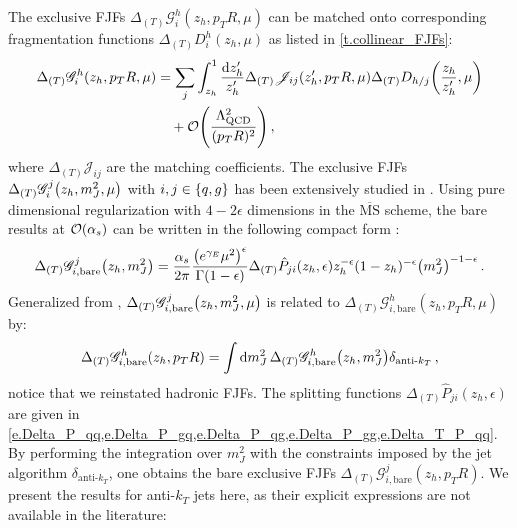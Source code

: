 \documentclass[a4paper, 11 pt]{article}
\begin{document}
The exclusive FJFs $\Delta_{(T)}\mathscr{G}_i^h(z_h, p_TR, \mu)$ can be matched onto corresponding fragmentation functions $\Delta_{(T)}D_i^h(z_h, \mu)$ as listed in \cref{t.collinear_FJFs}:
\begin{align} \label{e.collinear_exclusive_FJF_matching}
\Delta _{(T)} \mathscr{G}_i^h (z_h, p_TR, \mu)
& =
\sum_j \int _{z_h}^1 \frac{\dd{z'_h}}{z'_h}
\Delta _{(T)} \mathscr{J}_{ij} (z'_h, p_TR, \mu)
\Delta _{(T)} D_{h/j} \pqty{\frac{z_h}{z'_h}, \mu}
\nonumber \\
& \quad +
\order{\frac{\Lambda _{\mathrm{QCD}}^2}{(p_TR)^2}}
\, ,
\end{align}
where $\Delta _{(T)} \mathscr{J}_{ij}$ are the matching coefficients.
The exclusive FJFs $\Delta _{(T)} \mathscr{G}_i^j \pqty{z_h, m_J^2, \mu}$ with $i, j \in \Bqty{q, g}$ has been extensively studied in \cite{Jain:2011xz, Ritzmann:2014mka}.
Using pure dimensional regularization with $4 - 2 \epsilon$ dimensions in the $\overline{\mathrm{MS}}$ scheme, the bare results at $\order{\alpha _s}$ can be written in the following compact form \cite{ Giele:1991vf,Ritzmann:2014mka,Chien:2015ctp}:
\begin{equation}
\Delta _{(T)} \mathscr{G}_{i, \mathrm{bare}}^j \pqty{z_h, m_J^2}
=
\frac{\alpha _s}{2 \pi} \frac{\pqty{e^{\gamma _E} \mu^2}^\epsilon}{\Gamma (1 - \epsilon)}
\Delta _{(T)} \hat{P}_{ji}(z_h, \epsilon)
z_h^{-\epsilon} (1-z_h)^{-\epsilon} \pqty{m_J^2}^{-1-\epsilon}
\, .
\end{equation}
Generalized from \cite{Chien:2015ctp}, $\Delta _{(T)} \mathscr{G}_{i, \mathrm{bare}}^j \pqty{z_h, m_J^2, \mu}$ is related to $\Delta _{(T)}\mathscr{G}_{i,  \mathrm{bare}}^h (z_h, p_TR, \mu)$ by:
\begin{equation}
\Delta _{(T)} \mathscr{G}_{i,  \mathrm{bare}}^h (z_h, p_T R)
=
\int \dd{m_J^2} \Delta _{(T)} \mathscr{G}_{i, \mathrm{bare}}^h \pqty{z_h, m_J^2} \delta_{\text{anti-}k_T}
\, ,
\end{equation}
notice that we reinstated hadronic FJFs.
The splitting functions $\Delta _{(T)} \hat{P}_{ji} (z_h, \epsilon)$ are given in \cref{e.Delta_P_qq,e.Delta_P_gq,e.Delta_P_qg,e.Delta_P_gg,e.Delta_T_P_qq}.
By performing the integration over $m_J^2$ with the constraints imposed by the jet algorithm $\delta _{\text{anti-}k_T}$, one obtains the bare exclusive FJFs $\Delta_{(T)}\mathscr{G}_{i, \mathrm{bare }}^j(z_h, p_T R)$.
We present the results for anti-$k_T$ jets here, as their explicit expressions are not available in the literature:
\begingroup
\allowdisplaybreaks
\end{document}
